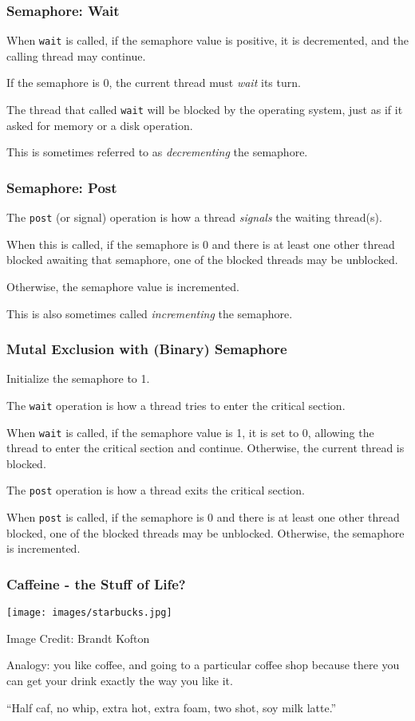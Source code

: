 \begin{frame}
	\frametitle{Semaphore: Wait}

	When \texttt{wait} is called, if the semaphore value is positive, it is decremented, and the calling thread may continue.

	If the semaphore is 0, the current thread must \textit{wait} its turn.

	The thread that called \texttt{wait} will be blocked by the operating system, just as if it asked for memory or a disk operation.

	This is sometimes referred to as \emph{decrementing} the semaphore.

\end{frame}

\begin{frame}
	\frametitle{Semaphore: Post}

	The \texttt{post} (or signal) operation is how a thread \textit{signals} the waiting thread(s).

	When this is called, if the semaphore is 0 and there is at least one other thread blocked awaiting that semaphore, one of the blocked threads may be unblocked.

	Otherwise, the semaphore value is incremented.

	This is also sometimes called \emph{incrementing} the semaphore.

\end{frame}

\begin{frame}
	\frametitle{Mutal Exclusion with (Binary) Semaphore}

	Initialize the semaphore to 1.

	The \texttt{wait} operation is how a thread tries to enter the critical section.

	When \texttt{wait} is called, if the semaphore value is 1, it is set to 0, allowing the thread to enter the critical section and continue.
	Otherwise, the current thread is blocked.

	The \texttt{post} operation is how a thread exits the critical section.

	When \texttt{post} is called, if the semaphore is 0 and there is at least one other thread blocked, one of the blocked threads may be unblocked.
	Otherwise, the semaphore is incremented.

\end{frame}

\begin{frame}
	\frametitle{Caffeine - the Stuff of Life?}

	\begin{center}
		\texttt{[image: images/starbucks.jpg]}
	\end{center}
	{\footnotesize \hfill Image Credit: Brandt Kofton}


	Analogy: you like coffee, and going to a particular coffee shop because there you can get your drink exactly the way you like it.

	``Half caf, no whip, extra hot, extra foam, two shot, soy milk latte.''

\end{frame}

